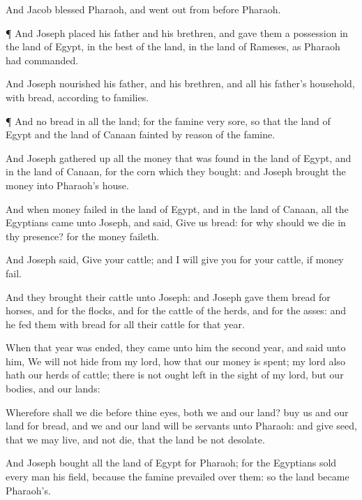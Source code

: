 {And
Jacob
blessed
Pharaoh, and went
out from
before
Pharaoh.


\par }{\PP {}¶ And
Joseph
placed his
father and his
brethren, and
gave them a
possession in the
land of
Egypt, in the
best of the
land, in the
land of
Rameses, as
Pharaoh had
commanded.

And
Joseph
nourished his
father, and his
brethren, and all his
father’s
household, with
bread,
according to
{}
families.


\par }{\PP {}¶ And
{} no
bread in all the
land; for the
famine
{}
very
sore, so that the
land of
Egypt and
{} the
land of
Canaan
fainted by
reason of the
famine.

And
Joseph gathered
up all the
money that was
found in the
land of
Egypt, and in the
land of
Canaan, for the
corn which they
bought: and
Joseph
brought the
money into
Pharaoh’s
house.

And when
money
failed in the
land of
Egypt, and in the
land of
Canaan, all the
Egyptians
came unto
Joseph, and
said,
Give us
bread: for why should we
die in thy presence? for the
money
faileth.

And
Joseph
said,
Give your
cattle; and I will
give you for your
cattle, if
money
fail.

And they
brought their
cattle unto
Joseph: and
Joseph
gave them
bread
{} for
horses, and for the
flocks, and for the
cattle of the
herds, and for the
asses: and he
fed them with
bread for all their
cattle for that
year.

When that
year was
ended, they
came unto him the
second
year, and
said unto him, We will not
hide
{} from my
lord, how that our
money is
spent; my
lord also
hath our
herds of
cattle; there is not ought
left in the
sight of my
lord, but our
bodies, and our
lands:

Wherefore shall we
die before thine
eyes, both we and our
land?
buy us and our
land for
bread, and we and our
land will be
servants unto
Pharaoh: and
give
{}
seed, that we may
live, and not
die, that the
land be not
desolate.

And
Joseph
bought all the
land of
Egypt for
Pharaoh; for the
Egyptians
sold every
man his
field, because the
famine
prevailed over them: so the
land became
Pharaoh’s.

}
